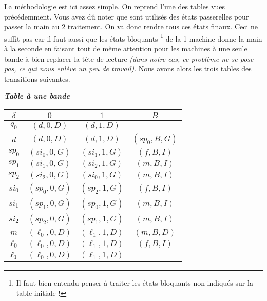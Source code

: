La méthodologie est ici assez simple. On reprend l'une des tables vues précédemment.
Vous avez dû noter que sont utilisés des états passerelles pour passer la main au 2\ieme{} traitement. On va donc rendre tous ces états finaux.
Ceci ne suffit pas car il faut aussi que les états bloquants
\footnote{
	Il faut bien entendu penser à traiter les états bloquants non indiqués sur la table initiale !
}
de la 1\iere{} machine donne la main à la seconde en faisant tout de même attention pour les machines à une seule bande à bien replacer la tête de lecture \emph{(dans notre cas, ce problème ne se pose pas, ce qui nous enlève un peu de travail)}.
Nous avons alors les trois tables des transitions suivantes.



\begin{center}
	\emph{\bfseries Table à une bande }
	
	\smallskip
	\begin{tabular}{|c||c|c|c|}
		\hline
		$\delta$ 
			& $0$ 
			& $1$
			& $B$ \\
		\hline
		\hline
		$q_0$ 
			& $(d , 0, D)$ 
			& $(d , 1, D)$
			&  \\
		\hline
		$d$ 
			& $(d , 0, D)$ 
			& $(d , 1, D)$
			& $(sp_0, B, G)$ \\
		\hline
		\hline
		$sp_0$ 
			& $(si_0 , 0, G)$ 
			& $(si_1 , 1, G)$
			& $(f    , B, I)$ \\
		\hline
		$sp_1$ 
			& $(si_1 , 0, G)$ 
			& $(si_2 , 1, G)$
			& $(m    , B, I)$ \\
		\hline
		$sp_2$ 
			& $(si_2 , 0, G)$ 
			& $(si_0 , 1, G)$
			& $(m    , B, I)$ \\
		\hline
		\hline
		$si_0$ 
			& $(sp_0 , 0, G)$ 
			& $(sp_2 , 1, G)$
			& $(f    , B, I)$ \\
		\hline
		$si_1$ 
			& $(sp_1 , 0, G)$ 
			& $(sp_0 , 1, G)$
			& $(m    , B, I)$ \\
		\hline
		$si_2$ 
			& $(sp_2 , 0, G)$ 
			& $(sp_1 , 1, G)$
			& $(m    , B, I)$ \\
		\hline
		\hline
		$m$
			& $(\ell_0 , 0 , D)$
			& $(\ell_1 , 1 , D)$
			& $(m      , B , D)$ \\
		\hline
		\hline
		$\ell_0$
			& $(\ell_0 , 0 , D)$
			& $(\ell_1 , 1 , D)$
			& $(f      , B , I)$ \\
		\hline
		$\ell_1$
			& $(\ell_0 , 0 , D)$
			& $(\ell_1 , 1 , D)$
			&                    \\
		\hline
	\end{tabular}
\end{center}




